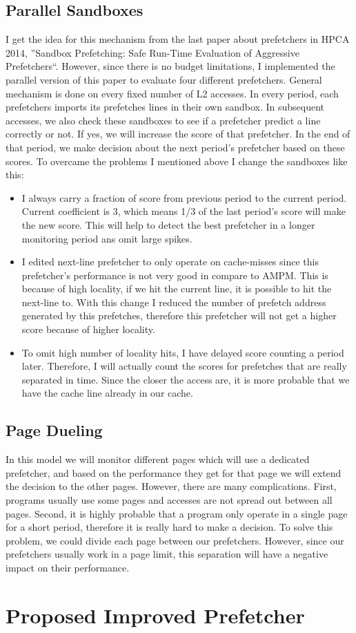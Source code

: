\documentclass{article}
\begin{document}
\subsection{Parallel Sandboxes}
I get the idea for this mechanism from the last paper about prefetchers in HPCA 2014, ''Sandbox Prefetching: Safe Run-Time Evaluation of Aggressive Prefetchers``. However, since there is no budget limitations, I implemented the parallel version of this paper to evaluate four different prefetchers. General mechanism is done on every fixed number of L2 accesses. In every period, each prefetchers imports its prefetches lines in their own sandbox. In subsequent accesses, we also check these sandboxes to see if a prefetcher predict a line correctly or not. If yes, we will increase the score of that prefetcher. In the end of that period, we make decision about the next period's prefetcher based on these scores. To overcame the problems I mentioned above I change the sandboxes like this:
\begin{itemize}
 \item I always carry a fraction of score from previous period to the current period. Current coefficient is 3, which means 1/3 of the last period's score will make the new score. This will help to detect the best prefetcher in a longer monitoring period ans omit large spikes.
 \item I edited next-line prefetcher to only operate on cache-misses since this prefetcher's performance is not very good in compare to AMPM. This is because of high locality, if we hit the current line, it is possible to hit the next-line to. With this change I reduced the number of prefetch address generated by this prefetches, therefore this prefetcher will not get a higher score because of higher locality. 
 \item To omit high number of locality hits, I have delayed score counting a period later. Therefore, I will actually count the scores for prefetches that are really separated in time. Since the closer the access are, it is more probable that we have the cache line already in our cache.
\end{itemize}

\subsection{Page Dueling}
In this model we will monitor different pages which will use a dedicated prefetcher, and based on the performance they get for that page we will extend the decision to the other pages. However, there are many complications. First, programs usually use some pages and accesses are not spread out between all pages. Second, it is highly probable that a program only operate in a single page for a short period, therefore it is really hard to make a decision. To solve this problem, we could divide each page between our prefetchers. However, since our prefetchers usually work in a page limit, this separation will have a negative impact on their performance.


\section{Proposed Improved Prefetcher}

% 
% 
% 
\end{document}

